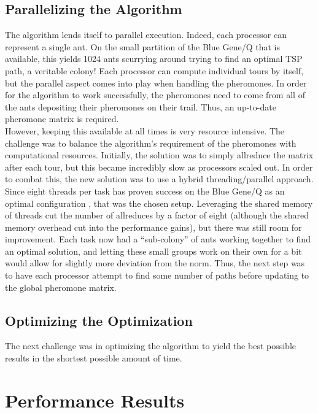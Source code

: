 \documentclass[twocolumn]{article}
\begin{document}
\subsection{Parallelizing the Algorithm}  \label{sec:parallel}

The algorithm lends itself to parallel execution. Indeed, each processor can
represent a single ant. On the small partition of the Blue Gene/Q that is
available, this yields 1024 ants scurrying around trying to find an optimal
TSP path, a veritable colony! Each processor can compute individual tours by
itself, but the parallel aspect comes into play when handling the pheromones.
In order for the algorithm to work successfully, the pheromones need to come from 
all of the ants depositing their pheromones on their trail. Thus, an up-to-date
pheromone matrix is required. \\

However, keeping this available at all times is
very resource intensive. The challenge was to balance the algorithm's requirement
of the pheromones with computational resources. Initially, the solution was to
simply allreduce the matrix after each tour, but this became incredibly 
slow as processors scaled out. In order to combat this, the new solution was
to use a hybrid threading/parallel approach. Since eight threads per task has 
proven success on the Blue Gene/Q as an optimal configuration \cite{lolours},
that was the chosen setup. Leveraging the shared memory of threads cut the 
number of allreduces by a factor of eight (although the shared memory overhead
cut into the performance gains), but there was still room for improvement. Each
task now had a ``sub-colony'' of ants working together to find an optimal 
solution, and letting these small groups work on their own for a bit would allow
for slightly more deviation from the norm. Thus, the next step was to have 
each processor attempt to find some number of paths before updating to the global 
pheromone matrix. 

\subsection{Optimizing the Optimization} \label{sec:opt}

The next challenge was in optimizing the algorithm to yield the best possible
results in the shortest possible amount of time. 


\section{Performance Results}
\end{document}
